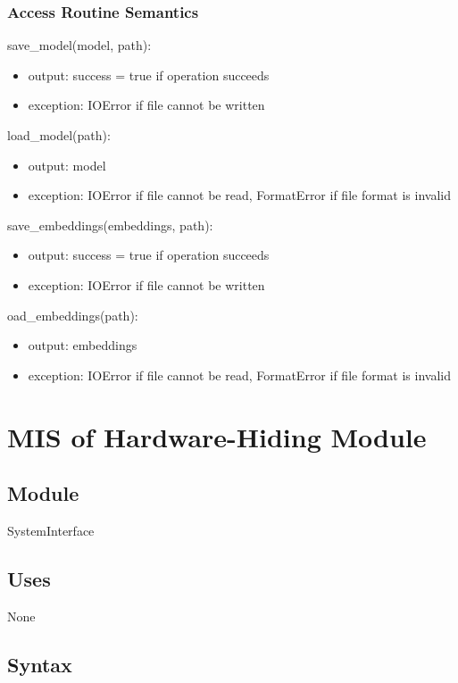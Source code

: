 \documentclass[12pt, titlepage]{article}
\begin{document}
\subsubsection{Access Routine Semantics}

\noindent save\_model(model, path):
\begin{itemize}
\item output:  success = true if operation succeeds
\item exception: IOError if file cannot be written
\end{itemize}

\noindent load\_model(path):
\begin{itemize}
\item output: model
\item exception: IOError if file cannot be read, FormatError if file format is invalid
\end{itemize}

\noindent save\_embeddings(embeddings, path):
\begin{itemize}
\item output: success = true if operation succeeds
\item exception: IOError if file cannot be written
\end{itemize}

\noindent oad\_embeddings(path):
\begin{itemize}
\item output: embeddings
\item exception: IOError if file cannot be read, FormatError if file format is invalid
\end{itemize}


\section{MIS of Hardware-Hiding Module} \label{ModuleHH}

\subsection{Module}

SystemInterface

\subsection{Uses}
None

\subsection{Syntax}
\end{document}
